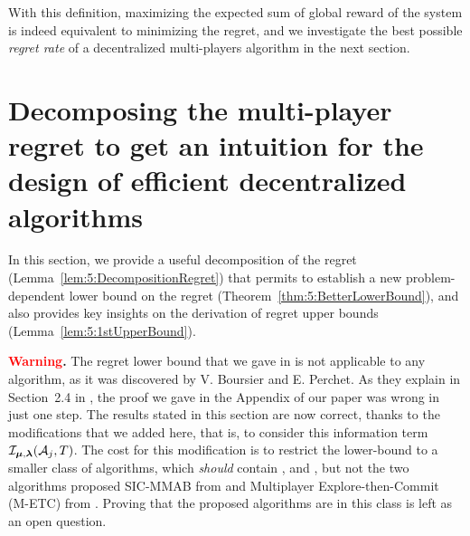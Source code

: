 With this definition, maximizing the expected sum of global reward of the system is indeed equivalent to minimizing the regret, and we investigate the best possible \emph{regret rate} of a decentralized multi-players algorithm in the next section.



\section[Regret decomposition and intuition about efficient decentralized algorithms]{Decomposing the multi-player regret to get an intuition for the design of efficient decentralized algorithms}
\label{sec:5:lowerbound}

In this section, we provide a useful decomposition of the regret (Lemma~\ref{lem:5:DecompositionRegret}) that permits to establish a new problem-dependent lower bound on the regret (Theorem~\ref{thm:5:BetterLowerBound}), and also provides key insights on the derivation of regret upper bounds (Lemma~\ref{lem:5:1stUpperBound}).

\begin{leftbar}[warningbar]  %
  \textbf{\textcolor{red}{Warning}.}
  The regret lower bound that we gave in \cite{Besson2018ALT} is not applicable to any algorithm,
  as it was discovered by V. Boursier and E. Perchet.
  As they explain in Section~2.4 in \cite{BoursierPerchet18},
  the proof we gave in the Appendix of our paper \cite{Besson2018ALT} was wrong in just one step.
  The results stated in this section are now correct,
  thanks to the modifications that we added here, that is, to consider this information term $\mathcal{I}_{\bm{\mu},\bm{\lambda}}(\mathcal{A}_j,T)$.
  The cost for this modification is to restrict the lower-bound to a smaller class of algorithms, which \emph{should} contain \RhoRand, \RandTopM{} and \MCTopM, but not the two algorithms proposed SIC-MMAB from \cite{BoursierPerchet18} and Multiplayer Explore-then-Commit (M-ETC) from \cite{KaufmannAbbas19}.
  Proving that the proposed algorithms are in this class is left as an open question.
\end{leftbar}  %


